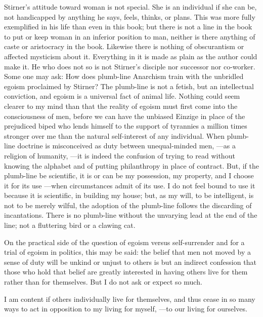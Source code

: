 Stirner's attitude toward woman is not special. She is an individual if she 
can be, not handicapped by anything he says, feels, thinks, or plans. This was 
more fully exemplified in his life than even in this book; but there is not a 
line in the book to put or keep woman in an inferior position to man, neither 
is there anything of caste or aristocracy in the book. Likewise there is 
nothing of obscurantism or affected mysticism about it. Everything in it is 
made as plain as the author could make it. He who does not so is not Stirner's 
disciple nor successor nor co-worker. Some one may ask: How does plumb-line 
Anarchism train with the unbridled egoism proclaimed by Stirner? The 
plumb-line is not a fetish, but an intellectual conviction, and egoism is a 
universal fact of animal life. Nothing could seem clearer to my mind than that 
the reality of egoism must first come into the consciousness of men, before we 
can have the unbiased Einzige in place of the prejudiced biped who lends 
himself to the support of tyrannies a million times stronger over me than the 
natural self-interest of any individual. When plumb-line doctrine is 
misconceived as duty between unequal-minded men, ---as a religion of humanity, ---it is indeed the confusion of trying to read without knowing the alphabet 
and of putting philanthropy in place of contract. But, if the plumb-line be 
scientific, it is or can be my possession, my property, and I choose it for 
its use ---when circumstances admit of its use. I do not feel bound to use it 
because it is scientific, in building my house; but, as my will, to be 
intelligent, is not to be merely wilful, the adoption of the plumb-line 
follows the discarding of incantations. There is no plumb-line without the 
unvarying lead at the end of the line; not a fluttering bird or a clawing cat.

On the practical side of the question of egoism versus self-surrender and for 
a trial of egoism in politics, this may be said: the belief that men not moved 
by a sense of duty will be unkind or unjust to others is but an indirect 
confession that those who hold that belief are greatly interested in having 
others live for them rather than for themselves. But I do not ask or expect so 
much.

I am content if others individually live for themselves, and thus cease in so 
many ways to act in opposition to my living for myself, ---to our living for 
ourselves.

